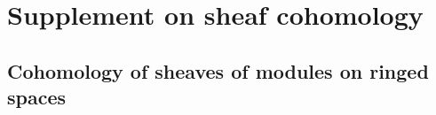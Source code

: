 \section{Supplement on sheaf cohomology}
\label{section:0.12}

\subsection{Cohomology of sheaves of modules on ringed spaces}
\label{subsection:0.12.1}

